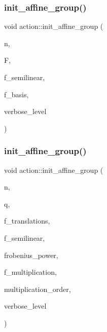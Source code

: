 \subsubsection{\texorpdfstring{init\+\_\+affine\+\_\+group()}{init\_affine\_group()}\hspace{0.1cm}{\footnotesize\ttfamily [1/2]}}
{\footnotesize\ttfamily void action\+::init\+\_\+affine\+\_\+group (\begin{DoxyParamCaption}\item[{\mbox{\hyperlink{galois_8h_a09fddde158a3a20bd2dcadb609de11dc}{I\+NT}}}]{n,  }\item[{\mbox{\hyperlink{classfinite__field}{finite\+\_\+field}} $\ast$}]{F,  }\item[{\mbox{\hyperlink{galois_8h_a09fddde158a3a20bd2dcadb609de11dc}{I\+NT}}}]{f\+\_\+semilinear,  }\item[{\mbox{\hyperlink{galois_8h_a09fddde158a3a20bd2dcadb609de11dc}{I\+NT}}}]{f\+\_\+basis,  }\item[{\mbox{\hyperlink{galois_8h_a09fddde158a3a20bd2dcadb609de11dc}{I\+NT}}}]{verbose\+\_\+level }\end{DoxyParamCaption})}

\mbox{\label{classaction_a80a99a8edaab58828f0d8db3dbf5bb86}} 
\subsubsection{\texorpdfstring{init\+\_\+affine\+\_\+group()}{init\_affine\_group()}\hspace{0.1cm}{\footnotesize\ttfamily [2/2]}}
{\footnotesize\ttfamily void action\+::init\+\_\+affine\+\_\+group (\begin{DoxyParamCaption}\item[{\mbox{\hyperlink{galois_8h_a09fddde158a3a20bd2dcadb609de11dc}{I\+NT}}}]{n,  }\item[{\mbox{\hyperlink{galois_8h_a09fddde158a3a20bd2dcadb609de11dc}{I\+NT}}}]{q,  }\item[{\mbox{\hyperlink{galois_8h_a09fddde158a3a20bd2dcadb609de11dc}{I\+NT}}}]{f\+\_\+translations,  }\item[{\mbox{\hyperlink{galois_8h_a09fddde158a3a20bd2dcadb609de11dc}{I\+NT}}}]{f\+\_\+semilinear,  }\item[{\mbox{\hyperlink{galois_8h_a09fddde158a3a20bd2dcadb609de11dc}{I\+NT}}}]{frobenius\+\_\+power,  }\item[{\mbox{\hyperlink{galois_8h_a09fddde158a3a20bd2dcadb609de11dc}{I\+NT}}}]{f\+\_\+multiplication,  }\item[{\mbox{\hyperlink{galois_8h_a09fddde158a3a20bd2dcadb609de11dc}{I\+NT}}}]{multiplication\+\_\+order,  }\item[{\mbox{\hyperlink{galois_8h_a09fddde158a3a20bd2dcadb609de11dc}{I\+NT}}}]{verbose\+\_\+level }\end{DoxyParamCaption})}

